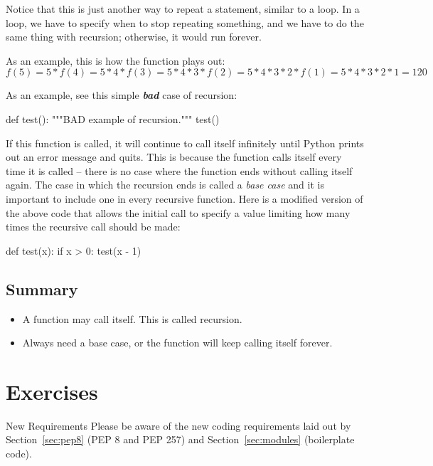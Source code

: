 \documentclass[11pt]{cselabheader}
\begin{document}
{Notice that this is just another way to repeat a statement, similar to a loop.
In a loop, we have to specify when to stop repeating something, and we have to
do the same thing with recursion; otherwise, it would run forever.

As an example, this is how the function plays out:
\[ f(5) = 5 * f(4) = 5 * 4 * f(3) = 5 * 4 * 3 * f(2) = 5 * 4 * 3 * 2 * f(1) = 5
* 4 * 3 * 2 * 1 = 120 \]

As an example, see this simple \textbf{\emph{bad}} case of recursion:

\begin{python3code}
def test():
    """BAD example of recursion."""
    test()
\end{python3code}

If this function is called, it will continue to call itself infinitely until
Python prints out an error message and quits. This is because the function calls
itself every time it is called -- there is no case where the function ends
without calling itself again. The case in which the recursion ends is called a
\emph{base case} and it is important to include one in every recursive function.
Here is a modified version of the above code that allows the initial call to
specify a value limiting how many times the recursive call should be made:

\begin{python3code}
def test(x):
    if x > 0:
        test(x - 1)
\end{python3code}

\subsection{Summary}
\label{subsec:adv.sum}

\begin{itemize}
  \item A function may call itself. This is called recursion.
  \item Always need a base case, or the function will keep calling itself
    forever.
\end{itemize}

\pagebreak

\section{Exercises}

\begin{warningbox}{New Requirements}
  Please be aware of the new coding requirements laid out by
  Section~\ref{sec:pep8} (PEP 8 and PEP 257) and Section~\ref{sec:modules}
  (boilerplate code).
\end{warningbox}

}
\end{document}
